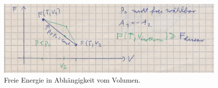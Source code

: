 \begin{figure}[H]
  \centering
  \includegraphics[width = \textwidth]{Zeichnungen/17.pdf}
  \caption{Freie Energie in Abhängigkeit vom Volumen.}
\end{figure}











